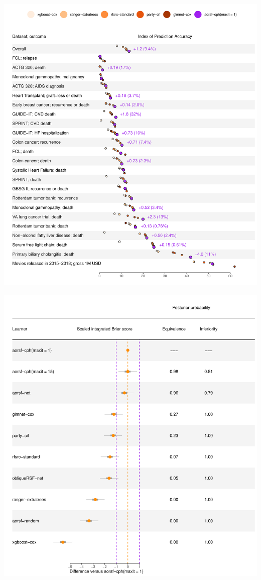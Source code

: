 \documentclass[twoside,11pt]{article}\usepackage[]{graphicx}\usepackage[]{color}
\makeatletter
\def\maxwidth{ %
  \ifdim\Gin@nat@width>\linewidth
    \linewidth
  \else
    \Gin@nat@width
  \fi
}
\newenvironment{knitrout}{}{} %
\makeatother
\begin{document}
\begin{knitrout}
\color{fgcolor}
\includegraphics[width=\maxwidth]{figure/unnamed-chunk-2-1} 
\end{knitrout}


\begin{knitrout}
\color{fgcolor}
\includegraphics[width=\maxwidth]{figure/unnamed-chunk-3-1} 
\end{knitrout}
\end{document}
